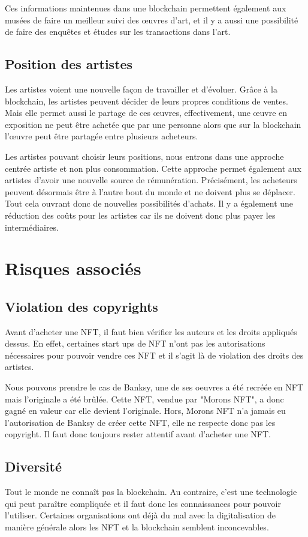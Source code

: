 \documentclass[11pt]{article}
\begin{document}
Ces informations maintenues dans une blockchain permettent également aux musées de faire un meilleur suivi des œuvres d'art, et il y a aussi une possibilité de faire des enquêtes et études sur les transactions dans l'art. \cite{jung_current_2022} 

\subsection{Position des artistes} %
Les artistes voient une nouvelle façon de travailler et d'évoluer. Grâce à la blockchain, les artistes peuvent décider de leurs propres conditions de ventes. Mais elle permet aussi le partage de ces œuvres, effectivement, une œuvre en exposition ne peut être achetée que par une personne alors que sur la blockchain l'œuvre peut être partagée entre plusieurs acheteurs.

Les artistes pouvant choisir leurs positions, nous entrons dans une approche centrée artiste et non plus consommation. Cette approche permet  également aux artistes d'avoir une nouvelle source de rémunération. Précisément, les acheteurs peuvent désormais être à l'autre bout du monde et ne doivent plus se déplacer. Tout cela ouvrant donc de nouvelles possibilités d'achats. \cite{whitaker_art_2019}
Il y a également une réduction des coûts pour les artistes car ils ne doivent donc plus payer les intermédiaires.

\section{Risques associés} %
\subsection{Violation des copyrights} %
Avant d'acheter une NFT, il faut bien vérifier les auteurs et les droits appliqués dessus. En effet, certaines start ups de NFT n'ont pas les autorisations nécessaires pour pouvoir vendre ces NFT et il s'agit là de violation des droits des artistes. 

Nous pouvons prendre le cas de Banksy, une de ses oeuvres a été recréée en NFT mais l'originale a été brûlée. Cette NFT, vendue par "Morons NFT", a donc gagné en valeur car elle devient l'originale. Hors, Morons NFT n'a jamais eu l'autorisation de Banksy de créer cette NFT, elle ne respecte donc pas les copyright. Il faut donc toujours rester attentif avant d'acheter une NFT. \cite{lydiate_crypto_2021}
\subsection{Diversité} %
Tout le monde ne connaît pas la blockchain. Au contraire, c'est une technologie qui peut paraître compliquée et il faut donc les connaissances pour pouvoir l'utiliser. Certaines organisations ont déjà du mal avec la digitalisation de manière générale alors les NFT et la blockchain semblent inconcevables. \cite{abbate_blockchain_2022}
\end{document}
